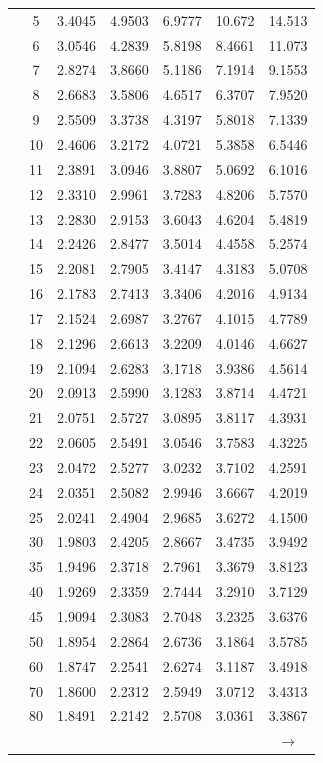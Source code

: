 \begin{minipage}{0.49\textwidth}
\begin{center}
\begin{tabular}{ccccccc}
			& 5 & 3.4045 & 4.9503 & 6.9777 & 10.672 & 14.513 \\
			& 6 & 3.0546 & 4.2839 & 5.8198 & 8.4661 & 11.073 \\
			& 7 & 2.8274 & 3.8660 & 5.1186 & 7.1914 & 9.1553 \\
			& 8 & 2.6683 & 3.5806 & 4.6517 & 6.3707 & 7.9520 \\
			& 9 & 2.5509 & 3.3738 & 4.3197 & 5.8018 & 7.1339 \\[5pt]
			& 10 & 2.4606 & 3.2172 & 4.0721 & 5.3858 & 6.5446 \\
			& 11 & 2.3891 & 3.0946 & 3.8807 & 5.0692 & 6.1016 \\
			& 12 & 2.3310 & 2.9961 & 3.7283 & 4.8206 & 5.7570 \\
			& 13 & 2.2830 & 2.9153 & 3.6043 & 4.6204 & 5.4819 \\
			& 14 & 2.2426 & 2.8477 & 3.5014 & 4.4558 & 5.2574 \\
			& 15 & 2.2081 & 2.7905 & 3.4147 & 4.3183 & 5.0708 \\
			& 16 & 2.1783 & 2.7413 & 3.3406 & 4.2016 & 4.9134 \\
			& 17 & 2.1524 & 2.6987 & 3.2767 & 4.1015 & 4.7789 \\
			& 18 & 2.1296 & 2.6613 & 3.2209 & 4.0146 & 4.6627 \\
			& 19 & 2.1094 & 2.6283 & 3.1718 & 3.9386 & 4.5614 \\[5pt]
			& 20 & 2.0913 & 2.5990 & 3.1283 & 3.8714 & 4.4721 \\
			& 21 & 2.0751 & 2.5727 & 3.0895 & 3.8117 & 4.3931 \\
			& 22 & 2.0605 & 2.5491 & 3.0546 & 3.7583 & 4.3225 \\
			& 23 & 2.0472 & 2.5277 & 3.0232 & 3.7102 & 4.2591 \\
			& 24 & 2.0351 & 2.5082 & 2.9946 & 3.6667 & 4.2019 \\
			& 25 & 2.0241 & 2.4904 & 2.9685 & 3.6272 & 4.1500 \\
			& 30 & 1.9803 & 2.4205 & 2.8667 & 3.4735 & 3.9492 \\
			& 35 & 1.9496 & 2.3718 & 2.7961 & 3.3679 & 3.8123 \\
			& 40 & 1.9269 & 2.3359 & 2.7444 & 3.2910 & 3.7129 \\
			& 45 & 1.9094 & 2.3083 & 2.7048 & 3.2325 & 3.6376 \\[5pt]
			& 50 & 1.8954 & 2.2864 & 2.6736 & 3.1864 & 3.5785 \\
			& 60 & 1.8747 & 2.2541 & 2.6274 & 3.1187 & 3.4918 \\
			& 70 & 1.8600 & 2.2312 & 2.5949 & 3.0712 & 3.4313 \\
			& 80 & 1.8491 & 2.2142 & 2.5708 & 3.0361 & 3.3867 \\
			&  &  &  &  &  & $\rightarrow$ \\
		\end{tabular}
	\end{center}
\end{minipage}
